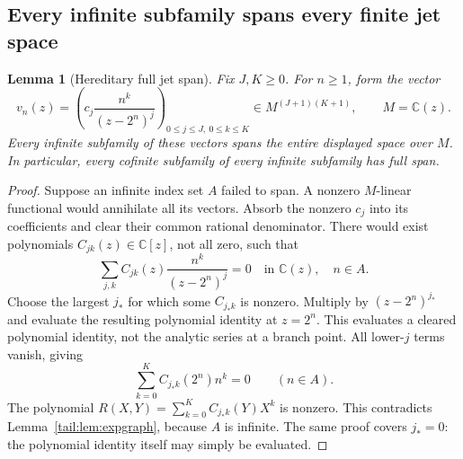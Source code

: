 \documentclass[11pt,a4paper]{article}
\numberwithin{equation}{section}
\newtheorem{lemma}[theorem]{Lemma}
\theoremstyle{definition}
\theoremstyle{remark}
\newcommand{\C}{\mathbb C}
\begin{document}
\subsection{Every infinite subfamily spans every finite jet space}
\begin{lemma}[Hereditary full jet span]\label{tail:lem:jetspan}
Fix $J,K\geq0$. For $n\geq1$, form the vector
\[
 v_n(z)=\left(c_j\frac{n^k}{(z-2^n)^j}
          \right)_{0\leq j\leq J,\ 0\leq k\leq K}
       \in M^{(J+1)(K+1)},\qquad M=\C(z).
\]
Every infinite subfamily of these vectors spans the entire displayed
space over $M$. In particular, every cofinite subfamily of every infinite
subfamily has full span.
\end{lemma}
\begin{proof}
Suppose an infinite index set $A$ failed to span. A nonzero $M$-linear
functional would annihilate all its vectors. Absorb the nonzero $c_j$
into its coefficients and clear their common rational denominator. There
would exist polynomials $C_{jk}(z)\in\C[z]$, not all zero, such that
\begin{equation}\label{tail:eq:jetlinearrelation}
 \sum_{j,k} C_{jk}(z)\frac{n^k}{(z-2^n)^j}=0
 \quad\text{in }\C(z),\quad n\in A.
\end{equation}
Choose the largest $j_*$ for which some $C_{j_*k}$ is nonzero. Multiply
by $(z-2^n)^{j_*}$ and evaluate the resulting polynomial identity at
$z=2^n$. This evaluates a cleared polynomial identity, not the analytic series at
a branch point. All lower-$j$ terms vanish, giving
\[
 \sum_{k=0}^K C_{j_*k}(2^n)n^k=0\qquad(n\in A).
\]
The polynomial
$R(X,Y)=\sum_{k=0}^K C_{j_*k}(Y)X^k$ is nonzero. This contradicts
Lemma~\ref{tail:lem:expgraph}, because $A$ is infinite. The same proof covers
$j_*=0$: the polynomial identity itself may simply be evaluated.
\end{proof}
\end{document}

